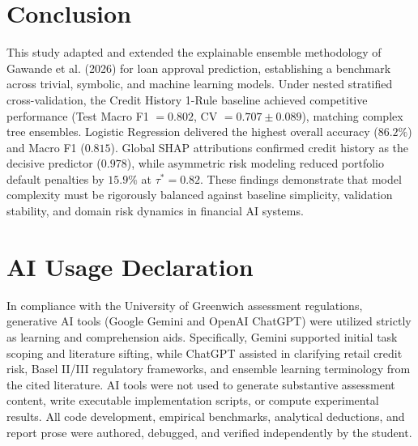 \documentclass{COMPXXXX}
\begin{document}
\section{Conclusion}
\label{sec:conclusion}
This study adapted and extended the explainable ensemble methodology of Gawande et al. (2026) for loan approval prediction, establishing a benchmark across trivial, symbolic, and machine learning models. Under nested stratified cross-validation, the Credit History 1-Rule baseline achieved competitive performance (Test Macro F1 $= 0.802$, CV $= 0.707 \pm 0.089$), matching complex tree ensembles. Logistic Regression delivered the highest overall accuracy ($86.2\%$) and Macro F1 ($0.815$). Global SHAP attributions confirmed credit history as the decisive predictor ($0.978$), while asymmetric risk modeling reduced portfolio default penalties by $15.9\%$ at $\tau^*=0.82$. These findings demonstrate that model complexity must be rigorously balanced against baseline simplicity, validation stability, and domain risk dynamics in financial AI systems.

\section*{AI Usage Declaration}
In compliance with the University of Greenwich assessment regulations, generative AI tools (Google Gemini and OpenAI ChatGPT) were utilized strictly as learning and comprehension aids. Specifically, Gemini supported initial task scoping and literature sifting, while ChatGPT assisted in clarifying retail credit risk, Basel II/III regulatory frameworks, and ensemble learning terminology from the cited literature. AI tools were not used to generate substantive assessment content, write executable implementation scripts, or compute experimental results. All code development, empirical benchmarks, analytical deductions, and report prose were authored, debugged, and verified independently by the student.


\end{document}
